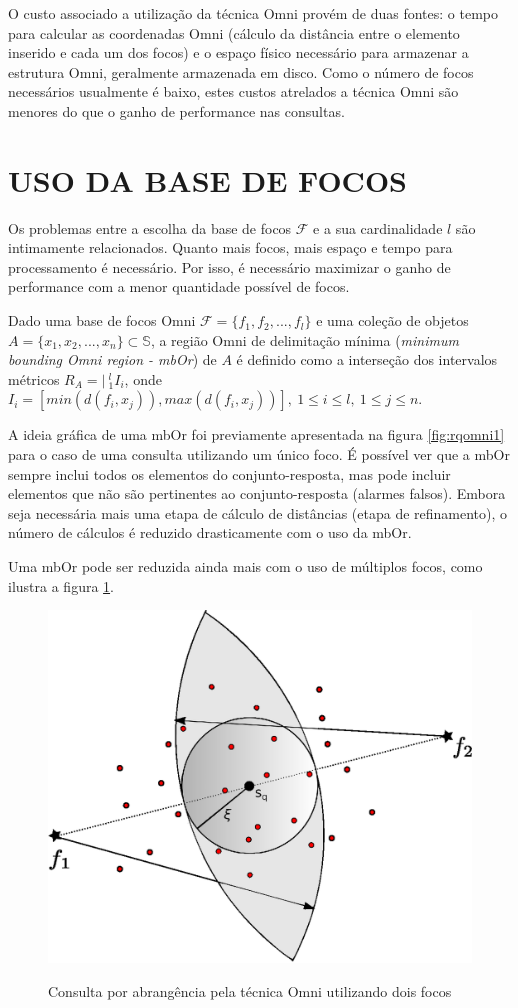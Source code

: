 O custo associado a utilização da técnica Omni provém de duas fontes: o tempo para calcular as coordenadas Omni (cálculo da distância
entre o elemento inserido e cada um dos focos) e o espaço físico necessário para armazenar a estrutura Omni, geralmente armazenada em disco.
Como o número de focos necessários usualmente é baixo, estes custos atrelados a técnica Omni são menores do que o ganho
de performance nas consultas.

\section{USO DA BASE DE FOCOS}
Os problemas entre a escolha da base de focos $\mathscr{F}$ e a sua cardinalidade $l$ são intimamente relacionados. Quanto
mais focos, mais espaço e tempo para processamento é necessário. Por isso, é necessário maximizar o ganho de performance com
a menor quantidade possível de focos.

\begin{mydef}
 Dado uma base de focos Omni $\mathscr{F} = \{f_1, f_2, ..., f_l\}$ e uma coleção de objetos $A = \{x_1,x_2,...,x_n\} \subset \mathbb{S}$, a
 região Omni de delimitação mínima (\textit{minimum bounding Omni region - mbOr}) de $A$ é definido como a interseção
 dos intervalos métricos $R_A = |\  ^{l}_{1}I_i$, onde $I_i = [min(d(f_i,x_j)), max(d(f_i,x_j))],\ 1\leq i \leq l,\ 1 \leq j \leq n$. 
\end{mydef}

A ideia gráfica de uma mbOr foi previamente apresentada na figura \ref{fig:rqomni1} para o caso de uma consulta utilizando um único foco.
É possível ver que a mbOr sempre inclui todos os elementos do conjunto-resposta, mas pode incluir elementos que não são pertinentes
ao conjunto-resposta (alarmes falsos). Embora seja necessária mais uma etapa de cálculo de distâncias (etapa de refinamento), o número de cálculos é
reduzido drasticamente com o uso da mbOr.\par

Uma mbOr pode ser reduzida ainda mais com o uso de múltiplos focos, como ilustra a figura \ref{fig:rqomni2}.

\begin{figure}[H]
\centering
\caption{Consulta por abrangência pela técnica Omni utilizando dois focos}
\includegraphics[width=.4\textwidth]{dados/figuras/rg_omni_2.eps}
\label{fig:rqomni2}
\end{figure}
								

